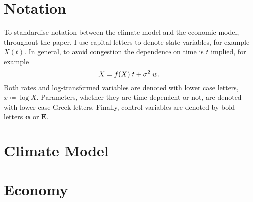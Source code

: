 \documentclass[american, abstract=off]{scrartcl}
\let\d\relax
\newcommand{\d}[1]{\mathrm{d}#1}
\newcommand{\control}[1]{\bm{#1}}
\begin{document}
\section{Notation}

To standardise notation between the climate model and the economic model, throughout the paper, I use capital letters to denote state variables, for example $X(t)$. In general, to avoid congestion the dependence on time is $t$ implied, for example \begin{equation}
  \d{X} = f(X) \; \d{t} + \sigma^2 \; \d{w}.
\end{equation} Both rates and log-transformed variables are denoted with lower case letters, $x \coloneqq \log X$. Parameters, whether they are time dependent or not, are denoted with lower case Greek letters. Finally, control variables are denoted by bold letters $\control{\alpha}$ or $\control{E}$.

\section{Climate Model}



\section{Economy}



\iffalse
  \section{Social Planner Problem}

  
  
  \appendix
  \section{Numerical Solution}
  
\fi


\ifdraft{}{
  \newpage
  \printbibliography
}
\end{document}
